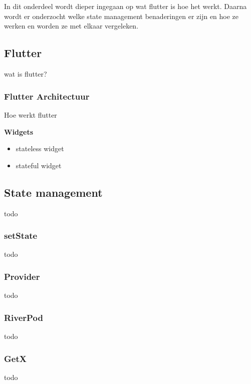 \chapter{}%
\label{ch:stand-van-zaken}

In dit onderdeel wordt dieper ingegaan op wat flutter is hoe het werkt. Daarna wordt er onderzocht welke state management benaderingen er 
zijn en hoe ze werken en worden ze met elkaar vergeleken.

\section{{Flutter}}%
\label{sec:Flutter}
wat is flutter?

\subsection{Flutter Architectuur}
\label{sec:Flutter Architectuur}
Hoe werkt flutter

\textbf{Widgets}
\\
 \begin{itemize}
     \item stateless widget
     \item stateful widget
 \end{itemize}

\section{{State management}}%
\label{sec:State management}
todo
\\
\subsection{{setState}}%
\label{sec:setState}
todo
\\
\subsection{{Provider}}%
\label{sec:Provider}
todo
\\
\subsection{{RiverPod}}%
\label{sec:RiverPod}
todo
\\
\subsection{{GetX}}%
\label{sec:GetX}
todo
\\
